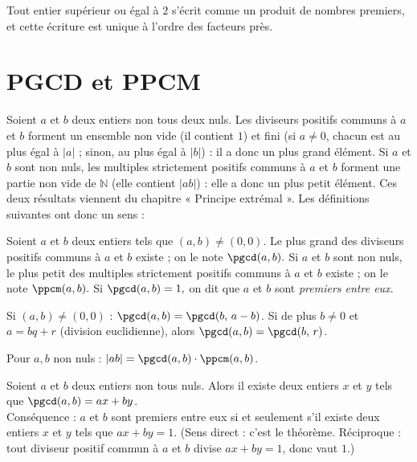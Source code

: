 \documentclass[11pt]{article}
\begin{document}
\begin{theoreme}
	Tout entier supérieur ou égal à $2$ s'écrit comme un produit de nombres premiers, et cette écriture est unique à l'ordre des facteurs près.
\end{theoreme}


\section{PGCD et PPCM}\label{sec:pgcd-ppcm}

Soient $a$ et $b$ deux entiers non tous deux nuls. Les diviseurs positifs communs à $a$ et $b$ forment un ensemble non vide (il contient $1$) et fini (si $a \neq 0$, chacun est au plus égal à $|a|$ ; sinon, au plus égal à $|b|$) : il a donc un plus grand élément. Si $a$ et $b$ sont non nuls, les multiples strictement positifs communs à $a$ et $b$ forment une partie non vide de $\mathbb{N}$ (elle contient $|ab|$) : elle a donc un plus petit élément. Ces deux résultats viennent du chapitre « Principe extrémal ». Les définitions suivantes ont donc un sens :

\begin{definition}
	Soient $a$ et $b$ deux entiers tels que $(a, b) \neq (0, 0)$. Le plus grand des diviseurs positifs communs à $a$ et $b$ existe ; on le note $\pgcd(a,b).$ Si $a$ et $b$ sont non nuls, le plus petit des multiples strictement positifs communs à $a$ et $b$ existe ; on le note $\ppcm(a,b).$ Si $\pgcd(a,b)=1,$ on dit que $a$ et $b$ sont \textit{premiers entre eux}.
\end{definition}

\begin{proposition}
	Si $(a,b)\neq(0,0)$ : $\pgcd(a, b) = \pgcd(b,\, a - b)$. Si de plus $b \neq 0$ et $a = bq + r$ (division euclidienne), alors $\pgcd(a, b) = \pgcd(b,\, r)$.
\end{proposition}

\begin{proposition}
	Pour $a, b$ non nuls : $|ab| = \pgcd(a, b) \cdot \ppcm(a, b)$.
\end{proposition}

\begin{theoreme}
	Soient $a$ et $b$ deux entiers non tous nuls. Alors il existe deux entiers $x$ et $y$ tels que $\pgcd(a, b) = ax + by$.\\
	\quad Conséquence : $a$ et $b$ sont premiers entre eux si et seulement s'il existe deux entiers $x$ et $y$ tels que $ax + by = 1$. (Sens direct : c'est le théorème. Réciproque : tout diviseur positif commun à $a$ et $b$ divise $ax + by = 1$, donc vaut $1$.)
\end{theoreme}
\end{document}
